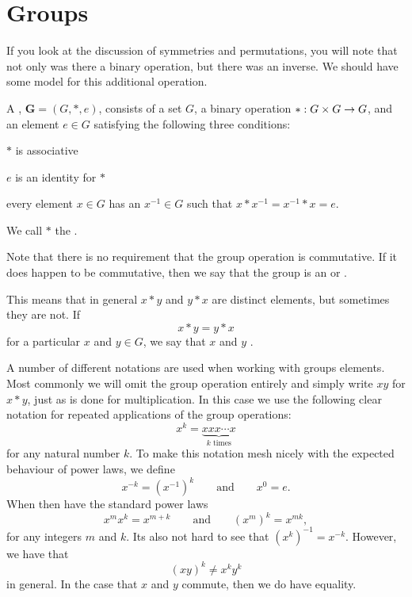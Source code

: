 \section{Groups}

If you look at the discussion of symmetries and permutations, you
will note that not only was there a binary operation, but there was an inverse.
We should have some model for this additional operation.

A , $\mathbf{G} = (G, \ast, e)$, consists of a set $G$, a binary
operation $\ast: G \times G \to G$, and an element $e \in G$
satisfying the following three conditions:
\begin{theoremenum}
  \item $\ast$ is associative
  \item $e$ is an identity for $\ast$
  \item every element $x \in G$ has an  $x^{-1} \in G$
such that $x \ast x^{-1} = x^{-1} \ast x = e$.
\end{theoremenum}
We call $\ast$ the .

Note that there is no requirement that the group operation is commutative. 
If it does happen to be commutative, then we say that the group is an
 or .

This means that in general $x \ast y$ and $y \ast x$ are distinct elements,
but sometimes they are not.  If
\[
  x \ast y = y \ast x
\]
for a particular $x$ and $y \in G$, we say that $x$ and $y$ .

A number of different notations are used when working with groups elements. 
Most commonly we will omit the group operation entirely and simply write $xy$
for $x \ast y$, just as is done for multiplication.  In this case we use the
following clear notation for repeated applications of the group operations:
\[
  x^{k} = \underbrace{x x x \cdots x}_{k\text{ times}}
\]
for any natural number $k$.  To make this notation mesh nicely with the
expected behaviour of power laws, we define
\[
  x^{-k} = (x^{-1})^{k} \qquad \text{and} \qquad x^{0} = e.
\]
When then have the standard power laws
\[
  x^{m}x^{k} = x^{m+k} \qquad \text{and} \qquad (x^{m})^{k} = x^{mk},
\]
for any integers $m$ and $k$.  Its also not hard to see that $(x^{k})^{-1} =
x^{-k}$.  However, we have that
\[
  (xy)^{k} \ne x^{k}y^{k}
\]
in general.  In the case that $x$ and $y$ commute, then we do have equality.


